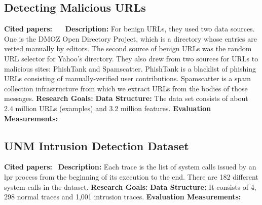 \subsection{Detecting Malicious URLs}
\textbf{Cited papers:}~\cite{ma2010exploiting}~\cite{ma2009identifying}~\cite{ma2009beyond} \newline
\textbf{Description:} For benign URLs, they used two data sources. One is the
DMOZ Open Directory Project, which is a directory whose entries are vetted manually by editors. The second source of benign URLs was the random URL selector for Yahoo’s directory. They also drew from two sources for URLs to malicious sites: PhishTank and Spamscatter. PhishTank is a blacklist of phishing URLs consisting of manually-verified user contributions. Spamscatter is a spam collection infrastructure from which we extract
URLs from the bodies of those messages.\newline
\textbf{Research Goals:}  \newline
\textbf{Data Structure:} The data set consists of about 2.4 million URLs (examples) and 3.2 million features. \newline
\textbf{Evaluation Measurements:} \newline


\subsection{UNM Intrusion Detection Dataset}
\textbf{Cited papers:}~\cite{yao2006enhanced} \newline
\textbf{Description:} Each trace is the list of system calls issued by an lpr process from the beginning of its execution to the end. There are 182 different system calls in the dataset.\newline
\textbf{Research Goals:}  \newline
\textbf{Data Structure:} It consists of 4, 298 normal traces and 1,001 intrusion traces.\newline
\textbf{Evaluation Measurements:} \newline


